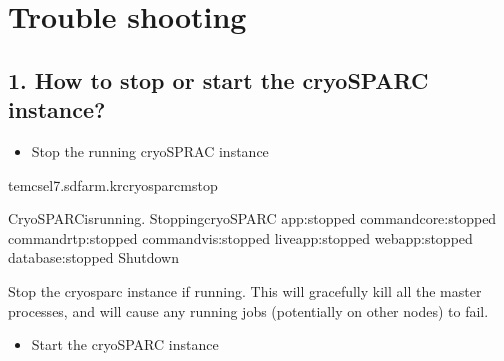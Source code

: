 \documentclass[a4paper,10pt,english]{sphinxmanual}
\begin{document}
\section{Trouble shooting}
\label{\detokenize{cryoSPARC:trouble-shooting}}

\subsection{1. How to stop or start the cryoSPARC instance?}
\label{\detokenize{cryoSPARC:how-to-stop-or-start-the-cryosparc-instance}}\begin{itemize}
\item {} 
\sphinxAtStartPar
Stop the running cryoSPRAC instance

\end{itemize}

\begin{sphinxVerbatim}[commandchars=\\\{\}]
tem\PYGZhy{}cs\PYGZhy{}el7.sdfarm.kr\PYGZdl{}\PYGZgt{}cryosparcmstop

CryoSPARCisrunning.
StoppingcryoSPARC
app:stopped
command\PYGZus{}core:stopped
command\PYGZus{}rtp:stopped
command\PYGZus{}vis:stopped
liveapp:stopped
webapp:stopped
database:stopped
Shutdown
\end{sphinxVerbatim}

\sphinxAtStartPar
Stop the cryosparc instance if running. This will gracefully kill all the master processes, and will cause any running jobs (potentially on other nodes) to fail.
\begin{itemize}
\item {} 
\sphinxAtStartPar
Start the cryoSPARC instance

\end{itemize}
\end{document}
